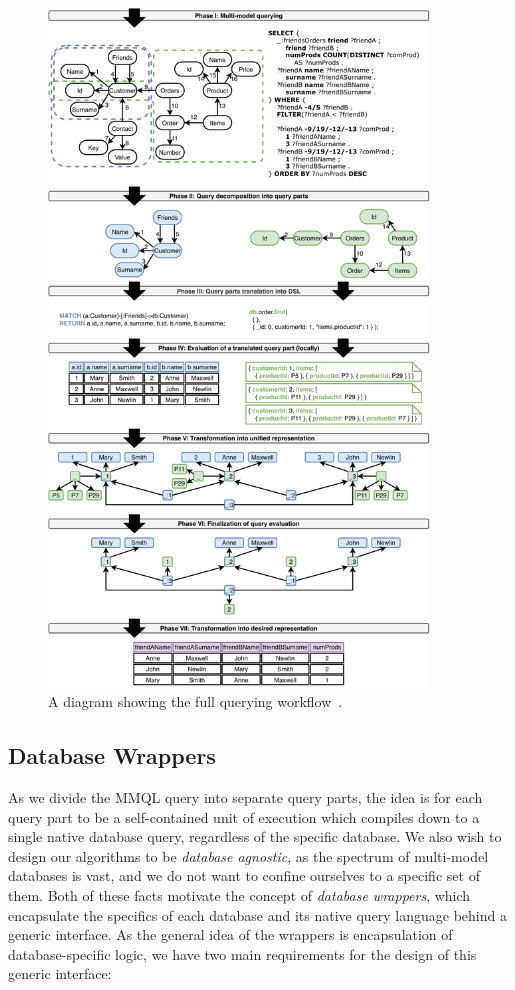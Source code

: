 \begin{figure}
\centering
\includegraphics[width=0.9\textwidth]{img/query-workflow.pdf} 
\caption{A diagram showing the full querying workflow~\cite{mm_quecat}.}
\label{fig:queryworkflow}
\end{figure}

\subsection{Database Wrappers}
\label{algorithms:subsection:wrappers}

As we divide the MMQL query into separate query parts, the idea is for each query part to be a self-contained unit of execution which compiles down to a single native database query, regardless of the specific database.
We also wish to design our algorithms to be \textit{database agnostic}, as the spectrum of multi-model databases is vast, and we do not want to confine ourselves to a specific set of them.
Both of these facts motivate the concept of \textit{database wrappers}, which encapsulate the specifics of each database and its native query language behind a generic interface.
As the general idea of the wrappers is encapsulation of database-specific logic, we have two main requirements for the design of this generic interface:

